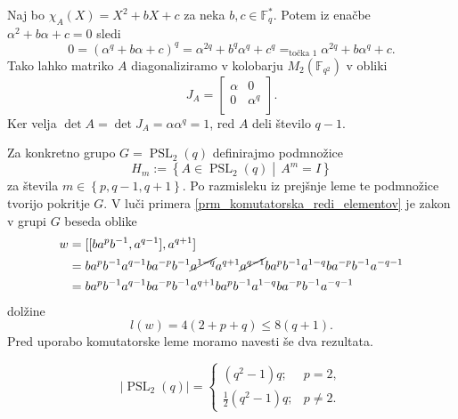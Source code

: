 \begin{dokaz}
\begin{enumerate}
    Naj bo $\chi_A(X) = X^2 + bX + c$ za neka $b ,c \in \mathbb{F}_q^{*}$. Potem iz enačbe $\alpha^2 + b \alpha + c  = 0$ sledi \begin{equation*}
    0 = (\alpha^{q} + b \alpha + c)^q =  \alpha^{2q} + b^{q} \alpha^{q} + c^{q} =_\text{točka 1} \alpha^{2q} + b \alpha^{q} + c.    
    \end{equation*}  
    Tako lahko matriko $A$ diagonaliziramo v kolobarju $M_2(\mathbb{F}_{q^2})$ v obliki \begin{equation*}
    J_A = \begin{bmatrix}
        \alpha & 0\\
        0 & \alpha^{q}\\
    \end{bmatrix}.
    \end{equation*}  
    Ker velja $\det A = \det J_A  = \alpha \alpha^{q} = 1$, red $A$ deli število $q-1$.
    \end{enumerate}   
\end{dokaz}
    Za konkretno grupo $G = \operatorname{PSL}_2(q)$ definirajmo podmnožice \begin{equation*}
        H_m := \left\{ A \in \operatorname{PSL}_2(q)  \middle|\,  A^{m} = I \right\}
    \end{equation*}  
       za števila $m \in \left\{ p, q-1 , q+1\right\}$.
    Po razmisleku iz prejšnje leme te podmnožice tvorijo pokritje $G$. V luči primera \ref{prm_komutatorska_redi_elementov} je zakon v grupi $G$ beseda oblike \begin{align*}
        w &= [[b a^{p} b^{-1}, a^{q-1}], a^{q + 1}]  \\
         &= b a^{p} b^{-1} a^{q-1} b a^{-p} b^{-1} \cancel{ a^{1 - q}} a^{q + 1} \cancel{a^{q -1}} b a^{p} b^{-1} a^{1 - q} b a^{-p} b^{-1} a^{- q - 1} \\ 
         &= b a^{p} b^{-1} a^{q-1} b a^{-p} b^{-1}  a^{q + 1}  b a^{p} b^{-1} a^{1 - q} b a^{-p} b^{-1} a^{- q - 1} 
    \end{align*}  
    dolžine \begin{equation*} 
    l(w) = 4(2 + p + q) \le 8(q + 1). 
    \end{equation*}
    Pred uporabo komutatorske leme moramo navesti še dva rezultata.
    \begin{lema}
    \label{lem_velikost_grupe_psl2q}
    \begin{equation*}
        \lvert \operatorname{PSL}_2(q) \rvert   = \begin{cases}
            (q^2 - 1) q; & p = 2,  \\
            \frac{1}{2} (q^2 - 1) q ; & p \neq 2.
        \end{cases}
     \end{equation*} 
    \end{lema}
